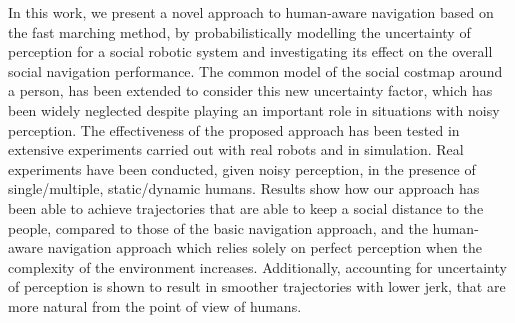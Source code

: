 In this work, we present a novel approach to human-aware navigation based on the fast marching method, by probabilistically modelling the uncertainty of perception for a social robotic system and investigating its effect on the overall social navigation performance. The common model of the social costmap around a person, has been extended to consider this new uncertainty factor, which has been widely neglected despite playing an important role in situations with noisy perception.  
The effectiveness of the proposed approach has been tested in extensive experiments carried out with real robots and in simulation. Real experiments have been conducted, given noisy perception, in the presence of single/multiple, static/dynamic humans. Results show how our approach has been able to achieve trajectories that are able to keep a social distance to the people, compared to those of the basic navigation approach, and the human-aware navigation approach which relies solely on perfect perception when the complexity of the environment increases. Additionally, accounting for uncertainty of perception is shown to result in smoother trajectories with lower jerk, that are more natural from the point of view of humans. 


